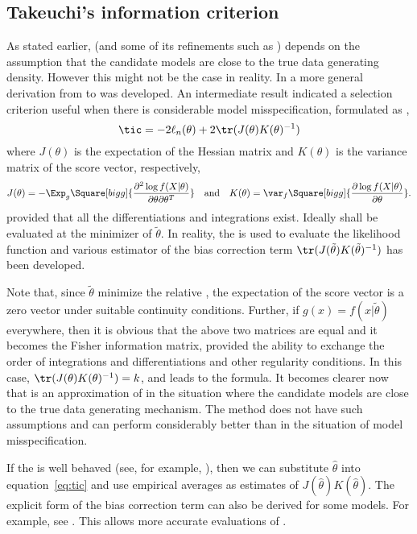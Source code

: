 \subsection{Takeuchi's information criterion}
\label{sub:Takeuchi's information criterion}

As stated earlier, \aic (and some of its refinements such as \aicc) depends on
the assumption that the candidate models are close to the true data generating
density. However this might not be the case in reality. In
\cite{Takeuchi:1976vx} a more general derivation from \kld to \aic was
developed. An intermediate result indicated a selection criterion useful when
there is considerable model misspecification, formulated as \tic,
\begin{equation}
  \tic = -2\ell_n(\theta) + 2\tr(J(\theta)K(\theta)^{-1})
  \label{eq:tic}
\end{equation}
where $J(\theta)$ is the expectation of the Hessian matrix and $K(\theta)$ is
the variance matrix of the score vector, respectively,
\begin{equation}
  J(\theta) = -\Exp_g\Square[bigg]{
    \frac{\partial^2\log f(X|\theta)}{\partial\theta\partial\theta^T}
  }\quad\text{and}\quad
  K(\theta) = \var_f\Square[bigg]{
    \frac{\partial\log f(X|\theta)}{\partial\theta}
  }.
\end{equation}
provided that all the differentiations and integrations exist. Ideally \tic
shall be evaluated at the minimizer of \kld $\tilde\theta$. In reality, the
\mle is used to evaluate the likelihood function and various estimator of the
bias correction term $\tr(J(\tilde\theta)K(\tilde\theta)^{-1})$ has been
developed.

Note that, since $\tilde\theta$ minimize the relative \kld, the expectation of
the score vector is a zero vector under suitable continuity conditions.
Further, if $g(x) = f(x|\tilde\theta)$ everywhere, then it is obvious that the
above two matrices are equal and it becomes the Fisher information matrix,
provided the ability to exchange the order of integrations and
differentiations and other regularity conditions. In this case,
$\tr(J(\theta)K(\theta)^{-1}) = k$, and \tic leads to the \aic formula. It
becomes clearer now that \aic is an approximation of \tic in the situation
where the candidate models are close to the true data generating mechanism.
The \tic method does not have such assumptions and can perform considerably
better than \aic in the situation of model misspecification.

If the \mle is well behaved (see, for example, \cite{Lehmann:1983vx}), then we
can substitute \mle $\hat\theta$ into equation~\ref{eq:tic} and use empirical
averages as estimates of $J(\hat\theta)K(\hat\theta)$. The explicit form of
the bias correction term can also be derived for some models. For example, see
\cite[][sec.~6.6]{Burnham:2002wc}. This allows more accurate evaluations of
\tic.

